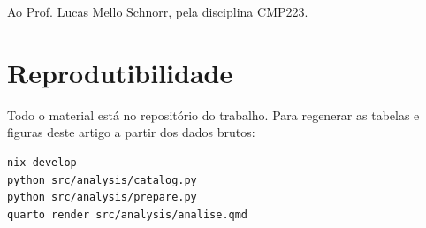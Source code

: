 \documentclass[acmsmall,nonacm,language=english,language=brazilian]{acmart}
\begin{document}
\begin{acks}
Ao Prof. Lucas Mello Schnorr, pela disciplina CMP223.
\end{acks}




\appendix
\section{Reprodutibilidade}
\label{app:repro}
Todo o material está no repositório do trabalho. Para regenerar as tabelas e
figuras deste artigo a partir dos dados brutos:
\begin{verbatim}
nix develop
python src/analysis/catalog.py
python src/analysis/prepare.py
quarto render src/analysis/analise.qmd
\end{verbatim}
\end{document}
